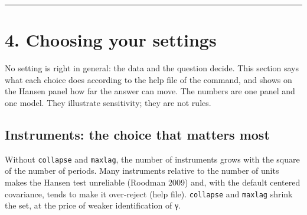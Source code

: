 \documentclass[
  10.5pt,
  a4paper,
]{article}
\begin{document}
\begin{center}\rule{0.5\linewidth}{0.5pt}\end{center}

\section{4. Choosing your settings}\label{choosing-your-settings}

No setting is right in general: the data and the question decide. This
section says what each choice does according to the help file of the
command, and shows on the Hansen panel how far the answer can move. The
numbers are one panel and one model. They illustrate sensitivity; they
are not rules.

\subsection{Instruments: the choice that matters
most}\label{instruments-the-choice-that-matters-most}

Without \texttt{collapse} and \texttt{maxlag}, the number of instruments
grows with the square of the number of periods. Many instruments
relative to the number of units makes the Hansen test unreliable
(Roodman 2009) and, with the default centered covariance, tends to make
it over-reject (help file). \texttt{collapse} and \texttt{maxlag} shrink
the set, at the price of weaker identification of γ.
\end{document}
